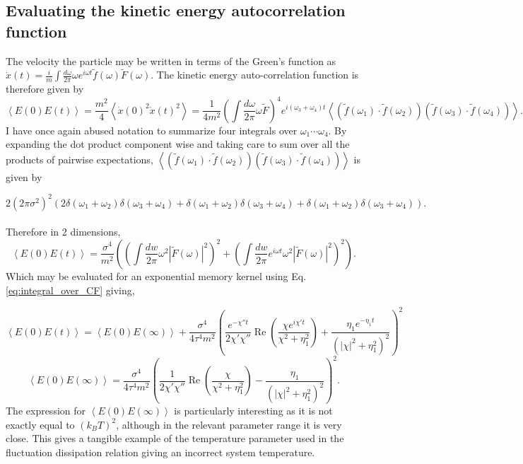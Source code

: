 \documentclass[7pt]{article}
\begin{document}
\subsection*{Evaluating the kinetic energy autocorrelation function}

The velocity the particle may be written in terms of the Green's function as $\dot{x}(t) = \frac{i}{m}\int\frac{d\omega}{2\pi} \omega e^{i\omega t}\tilde{f}(\omega)\tilde{F}(\omega)$. The kinetic energy auto-correlation function is therefore given by
$$
\left<E(0)E(t)\right>=\frac{m^2}{4}\left<\dot{x}(0)^2\dot{x}(t)^2\right>=\frac{1}{4m^2}\left(\int\frac{d\omega}{2\pi}\omega\tilde{F}\right)^4 e^{i\left(\omega_3 + \omega_4 \right)t} \left<\left(\tilde{f}(\omega_1)\cdot\tilde{f}(\omega_2)\right)\left(\tilde{f}(\omega_3)\cdot\tilde{f}(\omega_4)\right)\right>.
$$
I have once again abused notation to summarize four integrals over $\omega_1\cdots\omega_4$. By expanding the dot product component wise and taking care to sum over all the products of pairwise expectations,  $\left<\left(\tilde{f}(\omega_1)\cdot\tilde{f}(\omega_2)\right)\left(\tilde{f}(\omega_3)\cdot\tilde{f}(\omega_4)\right)\right>$ is given by

$$
2\left(2\pi\sigma^2\right)^2\left(2\delta(\omega_1+\omega_2)\delta(\omega_3+\omega_4) + \delta(\omega_1+\omega_2)\delta(\omega_3+\omega_4) + \delta(\omega_1+\omega_2)\delta(\omega_3+\omega_4)\right).
$$
\\
Therefore in 2 dimensions,
$$
\left<E(0)E(t)\right>=\frac{\sigma^4}{m^2}\left(\left(\int\frac{dw}{2\pi}\omega^2\left|\tilde{F}(\omega)\right|^2\right)^2 + \left(\int\frac{dw}{2\pi}e^{i\omega t}\omega^2\left|\tilde{F}(\omega)\right|^2\right)^2\right).
$$
Which may be evaluated for an exponential memory kernel using Eq. \ref{eq:integral_over_CF} giving,

\begin{equation}
	\left<E(0)E(t)\right>=\left<E(0)E(\infty)\right> + \frac{\sigma^4}{4\tau^4m^2}\left(\frac{e^{-\chi''t}}{2\chi'\chi''}\operatorname{Re}\left(\frac{\chi e^{i\chi't}}{\chi^2+\eta_1^2}\right) + \frac{\eta_1e^{-\eta_1 t}}{\left(\left|\chi\right|^2 + \eta_1^2\right)^2} \right)^2 \label{eq:ek_auto}
\end{equation}
$$
\left<E(0)E(\infty)\right> = \frac{\sigma^4}{4\tau^4m^2}\left(\frac{1}{2\chi'\chi''}\operatorname{Re}\left(\frac{\chi}{\chi^2+\eta_1^2}\right) - \frac{\eta_1}{\left(\left|\chi\right|^2 + \eta_1^2\right)^2} \right)^2.
$$
The expression for $\left<E(0)E(\infty)\right>$ is particularly interesting as it is not exactly equal to $(k_BT)^2$, although in the relevant parameter range it is very close. This gives a tangible example of the temperature parameter used in the fluctuation dissipation relation giving an incorrect system temperature.

\end{document}
